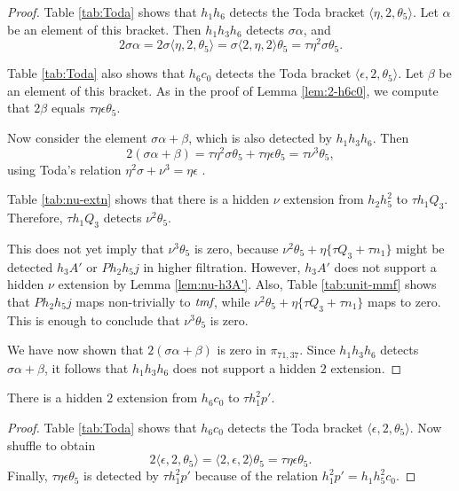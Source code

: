 \begin{proof}
Table \ref{tab:Toda} shows that
$h_1 h_6$ detects the Toda bracket $\langle \eta, 2, \theta_5 \rangle$.
Let $\alpha$ be an element of this bracket.
Then $h_1 h_3 h_6$ detects $\sigma \alpha$, and
\[
2 \sigma \alpha = 2 \sigma \langle \eta, 2, \theta_5 \rangle =
\sigma \langle 2, \eta, 2 \rangle \theta_5 = 
\tau \eta^2 \sigma \theta_5.
\]

Table \ref{tab:Toda} also shows that $h_6 c_0$ detects 
the Toda bracket $\langle \epsilon, 2, \theta_5 \rangle$.
Let $\beta$ be an element of this bracket.
As in the proof of Lemma \ref{lem:2-h6c0}, we compute
that $2 \beta$ equals $\tau \eta \epsilon \theta_5$.

Now consider the element $\sigma \alpha + \beta$, which is also
detected by $h_1 h_3 h_6$.  Then
\[
2(\sigma \alpha + \beta) = 
\tau \eta^2 \sigma \theta_5 + \tau \eta \epsilon \theta_5 =
\tau \nu^3 \theta_5,
\]
using Toda's relation $\eta^2 \sigma + \nu^3 = \eta \epsilon$
\cite{Toda62}.

Table \ref{tab:nu-extn} shows that there is a hidden
$\nu$ extension from $h_2 h_5^2$ to $\tau h_1 Q_3$.
Therefore, $\tau h_1 Q_3$ detects $\nu^2 \theta_5$.

This does not yet imply that $\nu^3 \theta_5$ is zero,
because $\nu^2 \theta_5 + \eta \{\tau Q_3 + \tau n_1\}$
might be detected $h_3 A'$ or $P h_2 h_5 j$ in higher filtration.
However, $h_3 A'$ does not support a hidden
$\nu$ extension by Lemma \ref{lem:nu-h3A'}.
Also, Table \ref{tab:unit-mmf} shows that
$P h_2 h_5 j$ maps non-trivially to $\textit{tmf}$,
while $\nu^2 \theta_5 + \eta \{\tau Q_3 + \tau n_1\}$
maps to zero.
This is enough to conclude that $\nu^3 \theta_5$ is zero.

We have now shown that $2(\sigma \alpha + \beta)$ is zero
in $\pi_{71,37}$.  Since $h_1 h_3 h_6$
detects $\sigma \alpha + \beta$, it follows that 
$h_1 h_3 h_6$ does not support a hidden $2$ extension.
\end{proof}

\begin{lemma}
\label{lem:2-h6c0}
There is a hidden $2$ extension from $h_6 c_0$ to $\tau h_1^2 p'$.
\end{lemma}

\begin{proof}
Table \ref{tab:Toda} shows that $h_6 c_0$ detects the Toda bracket
$\langle \epsilon, 2, \theta_5 \rangle$.
Now shuffle to obtain
\[
2 \langle \epsilon, 2, \theta_5 \rangle = 
\langle 2, \epsilon, 2 \rangle \theta_5 = 
\tau \eta \epsilon \theta_5.
\]
Finally, $\tau \eta \epsilon \theta_5$ is detected
by $\tau h_1^2 p'$ because of the relation
$h_1^2 p' = h_1 h_5^2 c_0$.
\end{proof}

